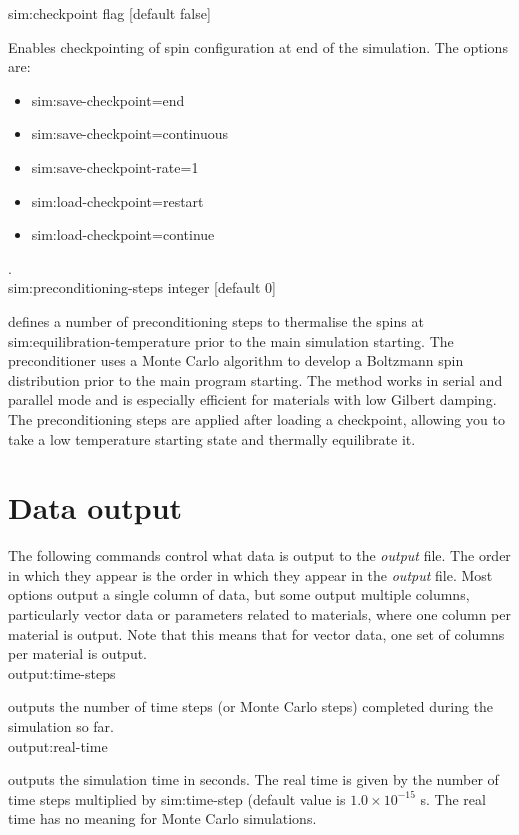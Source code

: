 {\zicf sim:checkpoint flag [default false]}
    Enables checkpointing of spin configuration at end of the simulation. The options are:

\begin{itemize}
  \item[] sim:save-checkpoint=end
  \item[] sim:save-checkpoint=continuous
  \item[] sim:save-checkpoint-rate=1
  \item[] sim:load-checkpoint=restart
  \item[] sim:load-checkpoint=continue
\end{itemize}
.\\

{\zicf sim:preconditioning-steps
    integer [default 0]}
    defines a number of preconditioning steps to thermalise the spins at
    sim:equilibration-temperature prior to the main simulation starting. The
    preconditioner uses a Monte Carlo algorithm to develop a Boltzmann spin
    distribution prior to the main program starting. The method works in serial
    and parallel mode and is especially efficient for materials with low Gilbert
    damping. The preconditioning steps are applied after loading a checkpoint,
    allowing you to take a low temperature starting state and thermally
    equilibrate it.\\

\section*{Data output}
The following commands control what data is output to the \textit{output} file.
The order in which they appear is the order in which they appear in the \textit{output} file.
Most options output a single column of data, but some output multiple columns, particularly
vector data or parameters related to materials, where one column per material is output. Note
that this means that for vector data, one set of columns per material is output.\\

{\zicf output:time-steps} outputs
the number of time steps (or Monte Carlo steps) completed during the simulation so far.\\

{\zicf output:real-time} outputs
the simulation time in seconds. The real time is given by the number of time steps
multiplied by sim:time-step (default value is $1.0 \times 10^{-15}$ s. The real
time has no meaning for Monte Carlo simulations.\\

